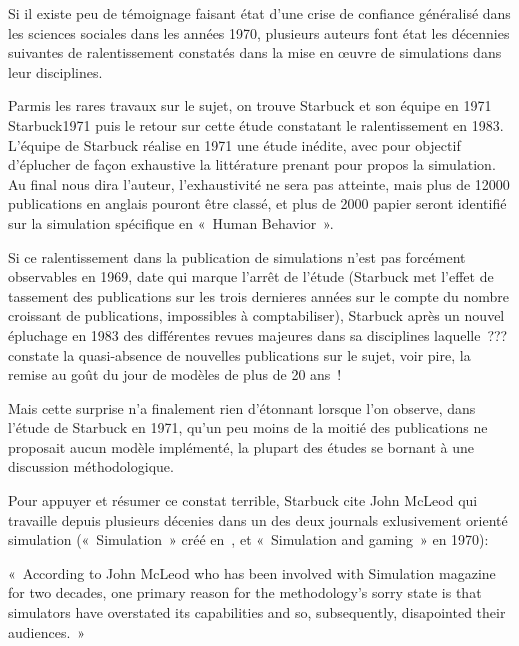 Si il existe peu de témoignage faisant état d'une crise de confiance généralisé dans les sciences sociales dans les années 1970,  plusieurs auteurs font état les décennies suivantes de ralentissement constatés dans la mise en œuvre de simulations dans leur disciplines. %

Parmis les rares travaux sur le sujet, on trouve Starbuck et son équipe en 1971 {Starbuck1971} puis le retour sur cette étude constatant le ralentissement en 1983. L'équipe de Starbuck réalise en 1971 une étude inédite, avec pour objectif d'éplucher de façon exhaustive la littérature prenant pour propos la simulation. Au final nous dira l'auteur, l'exhaustivité ne sera pas atteinte, mais plus de 12000 publications en anglais pouront être classé, et plus de 2000 papier seront identifié sur la simulation spécifique en « Human Behavior ».

Si ce ralentissement dans la publication de simulations n'est pas forcément observables en 1969, date qui marque l'arrêt de l'étude (Starbuck met l'effet de tassement des publications sur les trois dernieres années sur le compte du nombre croissant de publications, impossibles à comptabiliser), Starbuck après un nouvel épluchage en 1983 des différentes revues majeures dans sa disciplines laquelle ??? constate la quasi-absence de nouvelles publications sur le sujet, voir pire, la remise au goût du jour de modèles de plus de 20 ans !

Mais cette surprise n'a finalement rien d'étonnant lorsque l'on observe, dans l'étude de Starbuck en 1971, qu'un peu moins de la moitié des publications ne proposait aucun modèle implémenté, la plupart des études se bornant à une discussion méthodologique.

Pour appuyer et résumer ce constat terrible, Starbuck cite John McLeod qui travaille depuis plusieurs décenies dans un des deux journals exlusivement orienté simulation (« Simulation » créé en , et « Simulation and gaming » en 1970): 

« According to  John McLeod who has been involved with Simulation magazine for two decades, one primary reason for the methodology's sorry state is that simulators have overstated its capabilities and so, subsequently, disapointed their audiences. »

